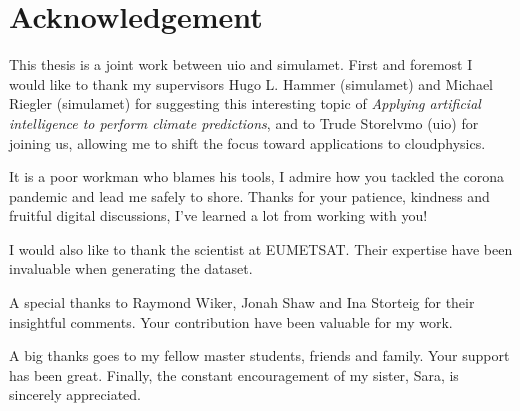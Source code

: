 \chapter*{Acknowledgement}
This thesis is a joint work between \acrfull{uio} and \acrfull{simulamet}. First and foremost I would like to thank my supervisors Hugo L. Hammer (\acrshort{simulamet}) and Michael Riegler (\acrshort{simulamet}) for suggesting this interesting topic of \textit{Applying artificial intelligence to perform climate predictions}, and to Trude Storelvmo (\acrshort{uio}) for joining us, allowing me to shift the focus toward applications to cloudphysics.

It is a poor workman who blames his tools, I admire how you tackled the corona pandemic and lead me safely to shore. Thanks for your patience, kindness and fruitful digital discussions, I've learned a lot from working with you!

I would also like to thank the scientist at EUMETSAT. 
Their expertise have been invaluable when generating the dataset. 

A special thanks to Raymond Wiker, Jonah Shaw and Ina Storteig for their %
insightful comments. Your contribution have been valuable for my work.

A big thanks goes to my fellow master students, friends and family. Your support has been great. Finally, the constant encouragement of my sister, Sara, is sincerely appreciated.
\cleardoublepage